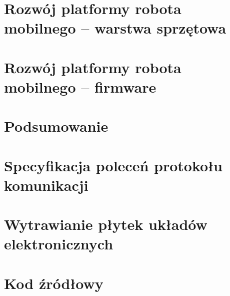 \documentclass[a4paper,12pt, oneside]{mwbk}
\begin{document}
\newpage
\chapter{Rozwój platformy robota mobilnego -- warstwa sprzętowa}









\chapter{Rozwój platformy robota mobilnego -- firmware}




\newpage
\chapter*{Podsumowanie}


\newpage 
\appendix
\chapter{Specyfikacja poleceń protokołu komunikacji}

\chapter{Wytrawianie płytek układów elektronicznych}

\chapter{Kod źródłowy}
%
\listoffigures
\listoftables

\newpage

{}


\newpage
\end{document}
